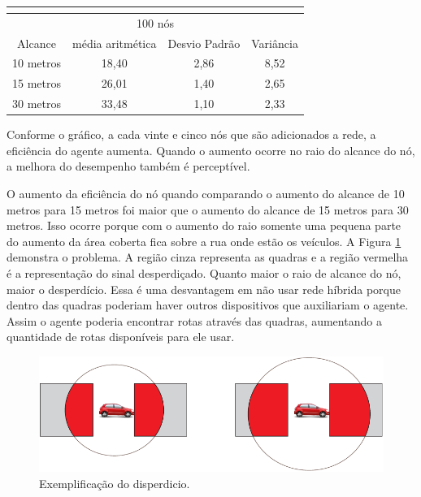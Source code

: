 \begin{table}[!htb]
\begin{minipage}{.5\linewidth}
\begin{tabular}{|c|c|c|c|}
			\multicolumn{4}{|c|}{} \\ \hline


			\multicolumn{4}{|c|}{100 nós} \\ \hline
			Alcance   & média aritmética &	Desvio Padrão &	Variância  \\ \hline
			10 metros &	18,40	& 2,86 & 8,52  \\ \hline
			15 metros &	26,01	& 1,40 & 2,65  \\ \hline
			30 metros &	33,48	& 1,10 & 2,33 \\ \hline

		\end{tabular}

	    \end{minipage} 
	\end{table}

Conforme o gráfico, a cada vinte e cinco nós que são adicionados a rede, a eficiência do agente aumenta. Quando o aumento ocorre no raio do alcance do nó, a melhora do desempenho também é perceptível. 

O aumento da eficiência do nó quando comparando o aumento do alcance de 10 metros para 15 metros foi maior que o aumento do alcance de 15 metros para 30 metros. Isso ocorre porque com o aumento do raio somente uma pequena parte do aumento da área coberta fica sobre a rua onde estão os veículos. A Figura \ref{fig:problemaDisperdicio} demonstra o problema. A região cinza representa as quadras e a região vermelha é a representação do sinal desperdiçado. Quanto maior o raio de alcance do nó, maior o desperdício. Essa é uma desvantagem em não usar rede híbrida porque dentro das quadras poderiam haver outros dispositivos que auxiliariam o agente. Assim o agente poderia encontrar rotas através das quadras, aumentando a quantidade de rotas disponíveis para ele usar.%

\begin{figure}[htbp]
		\centering
		\includegraphics[scale=0.5]{resultados/figuras/problemaDisperdicio.pdf}
		\caption{Exemplificação do disperdicio.}
		\label{fig:problemaDisperdicio}
	\end{figure}


